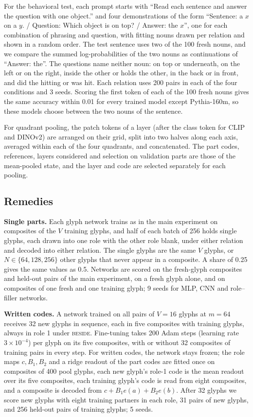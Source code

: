 \documentclass[10pt]{article}
\theoremstyle{plain}
\theoremstyle{remark}
\begin{document}
For the behavioral test, each prompt starts with ``Read each sentence and answer the question with one object.'' and four demonstrations of the form ``Sentence: a $x$ on a $y$. / Question: Which object is on top? / Answer: the $x$'', one for each combination of phrasing and question, with fitting nouns drawn per relation and shown in a random order. The test sentence uses two of the 100 fresh nouns, and we compare the summed log-probabilities of the two nouns as continuations of ``Answer: the''. The questions name neither noun: on top or underneath, on the left or on the right, inside the other or holds the other, in the back or in front, and did the hitting or was hit. Each relation uses 200 pairs in each of the four conditions and 3 seeds. Scoring the first token of each of the 100 fresh nouns gives the same accuracy within 0.01 for every trained model except Pythia-160m, so these models choose between the two nouns of the sentence.

For quadrant pooling, the patch tokens of a layer (after the class token for CLIP and DINOv2) are arranged on their grid, split into two halves along each axis, averaged within each of the four quadrants, and concatenated. The part codes, references, layers considered and selection on validation parts are those of the mean-pooled state, and the layer and code are selected separately for each pooling.

\subsection{Remedies}
\label{app:remedies}

\textbf{Single parts.} Each glyph network trains as in the main experiment on composites of the $V$ training glyphs, and half of each batch of 256 holds single glyphs, each drawn into one role with the other role blank, under either relation and decoded into either relation. The single glyphs are the same $V$ glyphs, or $N \in \{64, 128, 256\}$ other glyphs that never appear in a composite. A share of 0.25 gives the same values as 0.5. Networks are scored on the fresh-glyph composites and held-out pairs of the main experiment, on a fresh glyph alone, and on composites of one fresh and one training glyph; 9 seeds for MLP, CNN and role--filler networks.

\textbf{Written codes.} A network trained on all pairs of $V = 16$ glyphs at $m = 64$ receives 32 new glyphs in sequence, each in five composites with training glyphs, always in role 1 under \textsc{beside}. Fine-tuning takes 200 Adam steps (learning rate $3 \times 10^{-4}$) per glyph on its five composites, with or without 32 composites of training pairs in every step. For written codes, the network stays frozen; the role maps $c, B_1, B_2$ and a ridge readout of the part codes are fitted once on composites of 400 pool glyphs, each new glyph's role-1 code is the mean readout over its five composites, each training glyph's code is read from eight composites, and a composite is decoded from $c + B_1 e(a) + B_2 e(b)$. After 32 glyphs we score new glyphs with eight training partners in each role, 31 pairs of new glyphs, and 256 held-out pairs of training glyphs; 5 seeds.
\end{document}
